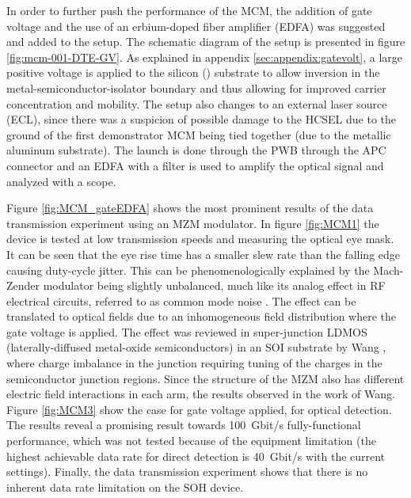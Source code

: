 In order to further push the performance of the MCM, the addition of gate voltage and the use of an erbium-doped fiber amplifier (EDFA) was suggested and added to the setup. The schematic diagram of the setup is presented in figure \ref{fig:mcm-001-DTE-GV}. As explained in appendix \ref{sec:appendix:gatevolt}, a large positive voltage is applied to the silicon () substrate to allow inversion in the metal-semiconductor-isolator boundary and thus allowing for improved carrier concentration and mobility. The setup also changes to an external laser source (ECL), since there was a suspicion of possible damage to the HCSEL due to the ground of the first demonstrator MCM being tied together (due to the metallic aluminum substrate). The launch is done through the PWB through the APC connector and an EDFA with a filter is used to amplify the optical signal and analyzed with a scope.



Figure \ref{fig:MCM_gateEDFA} shows the most prominent results of the data transmission experiment using an MZM modulator. In figure \ref{fig:MCM1} the device is tested at low transmission speeds and measuring the optical eye mask. It can be seen that the eye rise time has a smaller slew rate than the falling edge causing duty-cycle jitter. This can be phenomenologically explained by the Mach-Zender modulator being slightly unbalanced, much like its analog effect in RF electrical circuits, referred to as common mode noise \cite{DjordjevicCM10}. The effect can be translated to optical fields due to an inhomogeneous field distribution where the gate voltage is applied. The effect was reviewed in super-junction LDMOS (laterally-diffused metal-oxide semiconductors) in an SOI substrate by Wang \cite{WangGV09}, where charge imbalance in the junction requiring tuning of the charges in the semiconductor junction regions. Since the structure of the MZM also has different electric field interactions in each arm, the results observed in the work of Wang. Figure \ref{fig:MCM3} show the case for gate voltage applied, for optical detection. The results reveal a promising result towards \SI{100}{\giga bit/\second} fully-functional performance, which was not tested because of the equipment limitation (the highest achievable data rate for direct detection is \SI{40}{\giga bit/\second} with the current settings). Finally, the data transmission experiment shows that there is no inherent data rate limitation on the SOH device.   %

